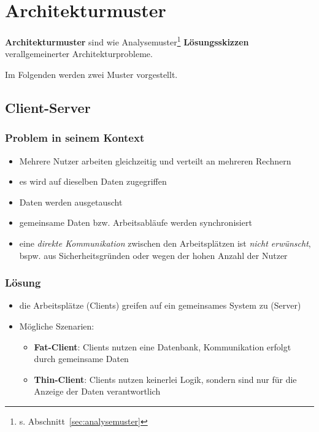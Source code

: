 \section{Architekturmuster}\label{sec:architekturmuster}

\textbf{Architekturmuster} sind wie Analysemuster\footnote{
    s. Abschnitt~\ref{sec:analysemuster}
} \textbf{Lösungsskizzen} verallgemeinerter Architekturprobleme.

\noindent
Im Folgenden werden zwei Muster vorgestellt.

\subsection{Client-Server}

\subsubsection*{Problem in seinem Kontext}
\begin{itemize}
    \item Mehrere Nutzer arbeiten gleichzeitig und verteilt an mehreren Rechnern
    \item es wird auf dieselben Daten zugegriffen
    \item Daten werden ausgetauscht
    \item gemeinsame Daten bzw. Arbeitsabläufe werden synchronisiert
    \item eine \textit{direkte Kommunikation} zwischen den Arbeitsplätzen ist \textit{nicht erwünscht}, bspw. aus Sicherheitsgründen oder wegen der hohen Anzahl der Nutzer
\end{itemize}


\subsubsection*{Lösung}

\begin{itemize}
    \item die Arbeitsplätze (Clients) greifen auf ein gemeinsames System zu (Server)
    \item Mögliche Szenarien:
        \begin{itemize}
            \item \textbf{Fat-Client}: Clients nutzen eine Datenbank, Kommunikation erfolgt durch gemeinsame Daten
            \item \textbf{Thin-Client}: Clients nutzen keinerlei Logik, sondern sind nur für die Anzeige der Daten verantwortlich
        \end{itemize}
\end{itemize}

